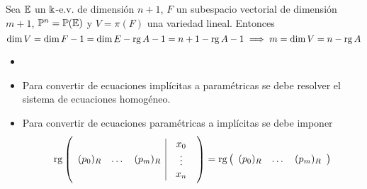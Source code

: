 \begin{obs}
        Sea $\mathbb{E}$ un $\Bbbk$-e.v. de dimensión $n+1$, $F$ un subespacio vectorial de dimensión $m+1$, $\mathbb{P}^n = \mathbb{P}(\mathbb{E})$ y $V = \pi(F)$
        una variedad lineal.
        Entonces
        \[\dim V = \dim F - 1 = \dim E - \operatorname{rg} A - 1 = n+1 - \operatorname{rg} A - 1 \implies m = \dim V = n - \operatorname{rg} A\]
\end{obs}
\begin{obs}
    \begin{itemize}
        \item[]
        \item Para convertir de ecuaciones implícitas a paramétricas se debe resolver el sistema de ecuaciones homogéneo.
        \item Para convertir de ecuaciones paramétricas a implícitas se debe imponer
        \[
            \operatorname{rg}
            \left(
            \begin{array}{ccc|c}
                (p_0)_R & \dots & (p_m)_R & \begin{array}{c}x_0 \\ \vdots \\ x_n \end{array} \\
            \end{array}
            \right)
            =
            \operatorname{rg}
            \left(
            \begin{array}{ccc}
                (p_0)_R & \dots & (p_m)_R\\
            \end{array}
            \right)
        \]
    \end{itemize}
\end{obs}
